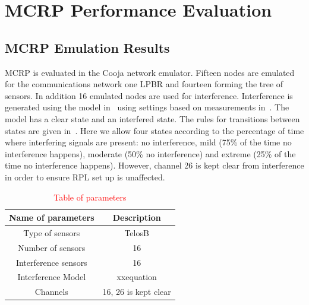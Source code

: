 \section{MCRP Performance Evaluation}
\label{MCRPemulation}

\subsection{MCRP Emulation Results}

MCRP is evaluated in the Cooja network emulator.  
Fifteen nodes are emulated for the communications network one LPBR and fourteen forming the tree of sensors.  In addition 16 emulated nodes are used for interference.  
Interference is generated using the model in~\cite{interferenceModel} using settings based on measurements in~\cite{radio2009}. The model has a clear state and an interfered state.  The rules for transitions between states are given in~\cite{interferenceModel}.  Here we allow four states according to the percentage of time where interfering signals are present: no interference, mild (75\% of the time no interference happens), moderate (50\% no interference) and extreme (25\% of the time no interference happens).  However, channel 26 is kept clear from interference in order to ensure RPL set up is unaffected. 

\begin{table}
\caption{\textcolor{red}{Table of parameters}}
\label{table1}
\begin{center}
\begin{tabular}{c c }
\hline
 Name of parameters & Description \\ 
 \hline
Type of sensors & TelosB \\
Number of sensors & 16 \\
Interference sensors & 16 \\
Interference Model & xxequation \\
Channels & 16, 26 is kept clear \\ 
\hline   
\end{tabular}
\end{center}
\end{table}

